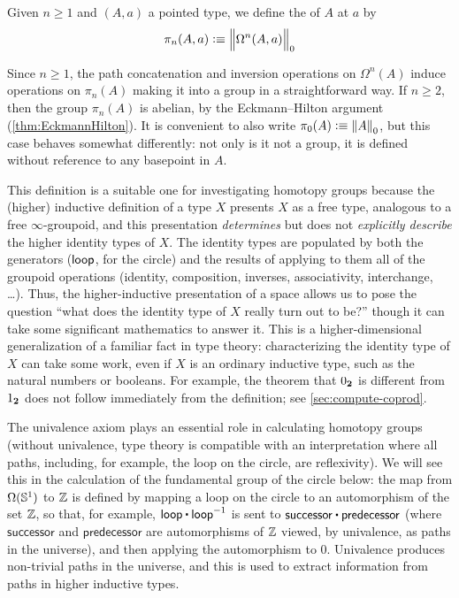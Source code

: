 \begin{defn}\label{def-of-homotopy-groups}
  Given $n\ge 1$ and $(A,a)$ a pointed type, we define the  of $A$
  at $a$ by
  \[\pi_n(A,a)\defeq \Trunc0{\Omega^n(A,a)}\]
\end{defn}

\noindent
Since $n\ge 1$, the path concatenation and inversion operations on
$\Omega^n(A)$ induce operations on $\pi_n(A)$ making it into a group in
a straightforward way.  If $n\ge 2$, then the group $\pi_n(A)$ is
abelian, by the Eckmann--Hilton argument  (\cref{thm:EckmannHilton}).
It is convenient to also write $\pi_0(A) \defeq \trunc0 A$,
but this case behaves somewhat differently: not only is it not a group,
it is defined without reference to any basepoint in $A$.

%
This definition is a suitable one for investigating homotopy groups
because the (higher) inductive definition of a type $X$ presents $X$ as
a free type, analogous to a free $\infty$-groupoid,
%
and this
presentation \emph{determines} but does not \emph{explicitly describe}
the higher identity types of $X$.  The identity types are populated by
both the generators ($\lloop$, for the circle) and the results of applying to them all of the groupoid
operations (identity, composition, inverses, associativity, interchange,
\ldots).  Thus, the higher-inductive presentation of a space allows us
to pose the question ``what does the identity type of $X$ really turn out
to be?'' though it can take some significant mathematics to answer it.
This is a higher-dimensional generalization of a familiar fact in type
theory: characterizing the identity type of $X$ can take some work,
even if $X$ is an ordinary inductive type, such as the natural numbers
or booleans.  For example, the theorem that $\bfalse$ is different
from $\btrue$ does not follow immediately from the definition;
see \cref{sec:compute-coprod}.

%
The univalence axiom plays an essential role in calculating homotopy
groups (without univalence, type theory is compatible with an
interpretation where all paths, including, for example, the loop on the
circle, are reflexivity).  We will see this in the calculation of the
fundamental group of the circle below: the map from $\Omega(\Sn^1)$ to $\Z$ is defined by mapping a loop on the circle to an
automorphism of the set $\Z$, so that, for example, $\lloop \ct \opp
\lloop$ is sent to $\mathsf{successor} \ct \mathsf{predecessor}$ (where
$\mathsf{successor}$ and $\mathsf{predecessor}$ are automorphisms of
$\Z$ viewed, by univalence, as paths in the universe), and then applying
the automorphism to 0. Univalence produces non-trivial paths in the
universe, and this is used to extract information from paths in higher
inductive types.

